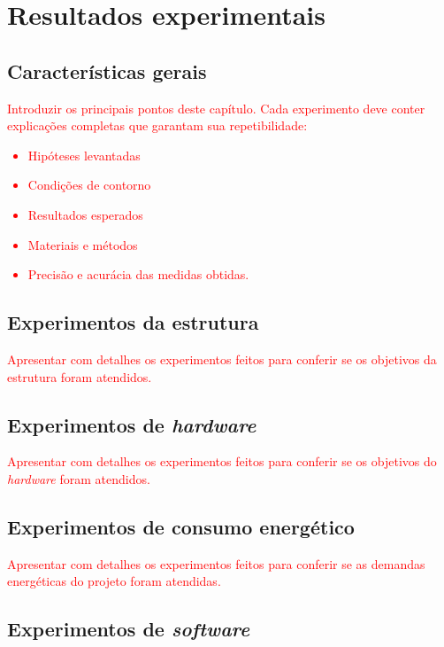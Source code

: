\chapter{Resultados experimentais}

\section{Características gerais}

\textcolor{red}{Introduzir os principais pontos deste capítulo. Cada experimento deve conter explicações completas que garantam sua repetibilidade:
\begin{itemize}
    \item Hipóteses levantadas
    \item Condições de contorno
    \item Resultados esperados
    \item Materiais e métodos
    \item Precisão e acurácia das medidas obtidas.
\end{itemize}
}

\section{Experimentos da estrutura}

\textcolor{red}{Apresentar com detalhes os experimentos feitos para conferir se os objetivos da estrutura foram atendidos.}

\section{Experimentos de \textit{hardware}}

\textcolor{red}{Apresentar com detalhes os experimentos feitos para conferir se os objetivos do \textit{hardware} foram atendidos.}

\section{Experimentos de consumo energético}

\textcolor{red}{Apresentar com detalhes os experimentos feitos para conferir se as demandas energéticas do projeto foram atendidas.}

\section{Experimentos de \textit{software}}

